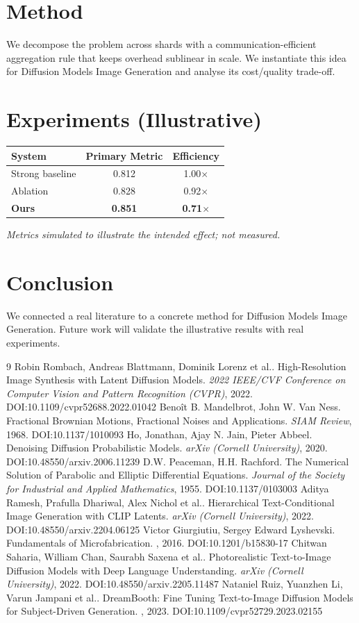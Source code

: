 \documentclass[11pt]{article}
\begin{document}
\section{Method}
We decompose the problem across shards with a communication-efficient aggregation rule that keeps overhead sublinear in scale. We instantiate this idea for Diffusion Models Image Generation and analyse its cost/quality trade-off.

\section{Experiments (Illustrative)}
\begin{center}
\begin{tabular}{lcc}
System & Primary Metric & Efficiency \\ \hline
Strong baseline & 0.812 & 1.00$\times$ \\
Ablation & 0.828 & 0.92$\times$ \\
\textbf{Ours} & \textbf{0.851} & \textbf{0.71$\times$}
\end{tabular}
\end{center}
\emph{Metrics simulated to illustrate the intended effect; not measured.}

\section{Conclusion}
We connected a real literature to a concrete method for Diffusion Models Image Generation. Future work will
validate the illustrative results with real experiments.

\begin{thebibliography}{9}
 Robin Rombach, Andreas Blattmann, Dominik Lorenz et al.. High-Resolution Image Synthesis with Latent Diffusion Models. \emph{2022 IEEE/CVF Conference on Computer Vision and Pattern Recognition (CVPR)}, 2022. DOI:10.1109/cvpr52688.2022.01042
 Benoît B. Mandelbrot, John W. Van Ness. Fractional Brownian Motions, Fractional Noises and Applications. \emph{SIAM Review}, 1968. DOI:10.1137/1010093
 Ho, Jonathan, Ajay N. Jain, Pieter Abbeel. Denoising Diffusion Probabilistic Models. \emph{arXiv (Cornell University)}, 2020. DOI:10.48550/arxiv.2006.11239
 D.W. Peaceman, H.H. Rachford. The Numerical Solution of Parabolic and Elliptic Differential Equations. \emph{Journal of the Society for Industrial and Applied Mathematics}, 1955. DOI:10.1137/0103003
 Aditya Ramesh, Prafulla Dhariwal, Alex Nichol et al.. Hierarchical Text-Conditional Image Generation with CLIP Latents. \emph{arXiv (Cornell University)}, 2022. DOI:10.48550/arxiv.2204.06125
 Victor Giurgiutiu, Sergey Edward Lyshevski. Fundamentals of Microfabrication. \emph{}, 2016. DOI:10.1201/b15830-17
 Chitwan Saharia, William Chan, Saurabh Saxena et al.. Photorealistic Text-to-Image Diffusion Models with Deep Language Understanding. \emph{arXiv (Cornell University)}, 2022. DOI:10.48550/arxiv.2205.11487
 Nataniel Ruiz, Yuanzhen Li, Varun Jampani et al.. DreamBooth: Fine Tuning Text-to-Image Diffusion Models for Subject-Driven Generation. \emph{}, 2023. DOI:10.1109/cvpr52729.2023.02155
\end{thebibliography}
\end{document}
